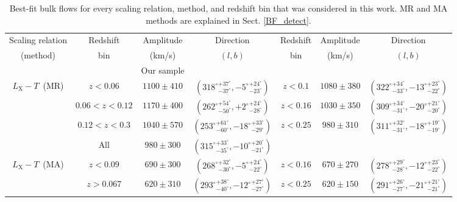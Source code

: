 \documentclass{aa}   %
\newcommand{\LT}{$L_{\text{X}}-T$}
\begin{document}
\begin{table}[hbtp]
\begin{center}
\begin{tabular}{ c  c  c  c c}
 \hline
 

\end{tabular}
\end{center}
\end{table}


\begin{table}[hbtp]
\caption{\small{Best-fit bulk flows for every scaling relation, method, and redshift bin that was considered in this work. MR and MA methods are explained in Sect. \ref{BF_detect}.}}
\label{BF_motions}
\begin{center}
\renewcommand{\arraystretch}{1.3}
\small
\begin{tabular}{ c  c  c  c | c  c c }
\hline \hline


Scaling relation  & Redshift & Amplitude& Direction & Redshift   & Amplitude  & Direction \\
(method)  & bin  & (km/s) & $(l,b)$ & bin  & (km/s)  & $(l,b)$\\
\hline \hline
&  &  Our sample & & & \\ \hline
\LT\ (MR)&  $z<0.06$ & $1100\pm 410$ & $({318^{\circ}}^{+37^{\circ}}_{-37^{\circ}},{-5^{\circ}}^{+24^{\circ}}_{-23^{\circ}})$ & $z<0.1$ & $1080\pm 380$  & $({322^{\circ}}^{+34^{\circ}}_{-33^{\circ}},{-13^{\circ}}^{+23^{\circ}}_{-22^{\circ}})$ \\ 
 &$0.06<z<0.12$ & $1170\pm 400$ & $({262^{\circ}}^{+54^{\circ}}_{-50^{\circ}},{+2^{\circ}}^{+24^{\circ}}_{-28^{\circ}})$ & $z<0.16$ & $1030\pm 350$  & $({309^{\circ}}^{+34^{\circ}}_{-31^{\circ}},{-20^{\circ}}^{+21^{\circ}}_{-20^{\circ}})$\\ 
&  $0.12<z<0.3$ & $1040\pm 570$ & $({253^{\circ}}^{+61^{\circ}}_{-60^{\circ}},{-18^{\circ}}^{+33^{\circ}}_{-29^{\circ}})$ & $z<0.25$ & $980\pm 310$ &  $({311^{\circ}}^{+32^{\circ}}_{-31^{\circ}},{-18^{\circ}}^{+19^{\circ}}_{-19^{\circ}})$\\ 
&  All & $980\pm 300$ & $({315^{\circ}}^{+33^{\circ}}_{-35^{\circ}},{-10^{\circ}}^{+20^{\circ}}_{-21^{\circ}})$ & & &\\ 
\LT\ (MA)&  $z<0.09$ & $690\pm 300$ & $({268^{\circ}}^{+32^{\circ}}_{-30^{\circ}},{-5^{\circ}}^{+24^{\circ}}_{-22^{\circ}})$ & $z<0.16$ & $670\pm 270$ & $({278^{\circ}}^{+29^{\circ}}_{-28^{\circ}},{-12^{\circ}}^{+23^{\circ}}_{-22^{\circ}})$\\ 
 &$z>0.067$ & $620\pm 310$ & $({293^{\circ}}^{+38^{\circ}}_{-40^{\circ}},{-12^{\circ}}^{+27^{\circ}}_{-27^{\circ}})$ & $z<0.25$  & $620\pm 150$ & $({291^{\circ}}^{+26^{\circ}}_{-27^{\circ}},{-21^{\circ}}^{+21^{\circ}}_{-21^{\circ}})$\\ 

\end{tabular}
\end{center}
\end{table}
\end{document}
